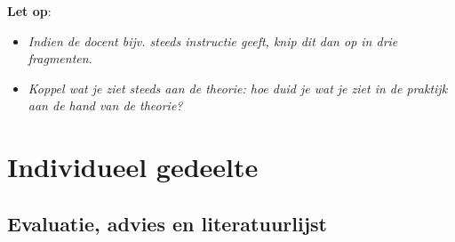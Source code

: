 \documentclass{article}
\begin{document}
    \textbf{Let op}:
    \begin{itemize}
        \item \textit{Indien de docent bijv. steeds instructie geeft, knip dit dan op in drie fragmenten.}
        \item \textit{Koppel wat je ziet steeds aan de theorie: hoe duid je wat je ziet in de praktijk aan de hand van de theorie?}
    \end{itemize}

    \newpage
    

    \section{Individueel gedeelte}

        \subsection{Evaluatie, advies en literatuurlijst}
\end{document}
